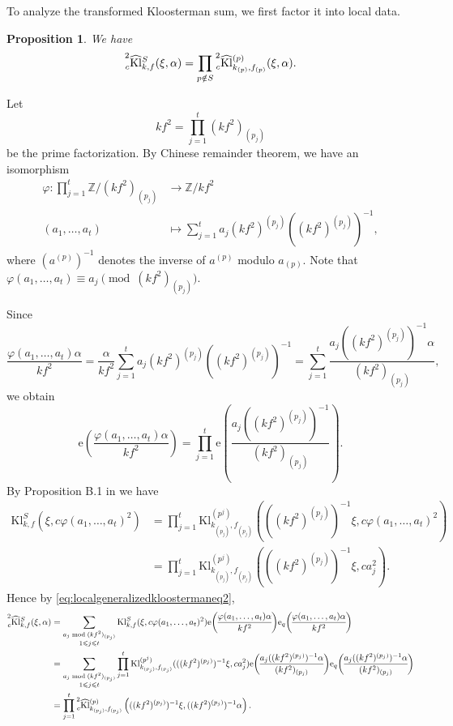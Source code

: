 \documentclass[10pt,oneside,reqno]{amsart}
\makeatletter
\newcommand\rme{\mathrm{e}}
\newcommand\ZZ{\mathbb{Z}}
\newcommand\Kl{\mathrm{Kl}}
\renewcommand\leq{\leqslant}
\newcommand\legendresymbol[2]{\genfrac{(}{)}{}{}{#1}{#2}}
\theoremstyle{THEOREM}
\newtheorem{proposition}[theorem]{Proposition}
\theoremstyle{DEFINITION}
\theoremstyle{EXERCISE}
\numberwithin{equation}{section}
\renewenvironment{proof}[1][\proofname]{\par
  \vspace{-6pt}
  \pushQED{\qed}
  \normalfont \topsep6\p@\@plus6\p@\relax
  \trivlist
  \item[\hskip\labelsep\rmfamily\bfseries
    #1\@addpunct{:}]\ignorespaces
}{
  \popQED\endtrivlist\@endpefalse
  \vspace{-6pt}
}
\makeatother
\begin{document}
To analyze the transformed Kloosterman sum, we first factor it into local data.
\begin{proposition}\label{prop:prodkloostermanlocal}
We have
\[
\prescript{2}{c}{\widehat{\Kl}}_{k,f}^S(\xi,\alpha)=\prod_{p\notin S}\prescript{2}{c}{\widehat{\Kl}}_{k_{(p)},f_{(p)}}^{(p)}(\xi,\alpha).
\]
\end{proposition}
\begin{proof}
Let
\[
kf^2=\prod_{j=1}^{t}(kf^2)_{(p_j)}
\]
be the prime factorization. By Chinese remainder theorem, we have an isomorphism
\[
\begin{split}
   \varphi: \prod_{j=1}^{t}\ZZ/(kf^2)_{(p_j)}&\to \ZZ/kf^2 \\
     (a_1,\dots,a_t) &\mapsto \sum_{j=1}^{t} a_j(kf^2)^{(p_j)}((kf^2)^{(p_j)})^{-1},
\end{split}
\]
where $(a^{(p)})^{-1}$ denotes the inverse of $a^{(p)}$ modulo $a_{(p)}$. Note that $\varphi(a_1,\dots,a_t)\equiv a_j\pmod{(kf^2)_{(p_j)}}$.

Since
\[
\frac{\varphi(a_1,\dots,a_t)\alpha}{kf^2}=\frac{\alpha}{kf^2}\sum_{j=1}^{t} a_j(kf^2)^{(p_j)}((kf^2)^{(p_j)})^{-1}=\sum_{j=1}^{t} \frac{a_j((kf^2)^{(p_j)})^{-1}\alpha}{(kf^2)_{(p_j)}},
\]
we obtain
\[
\rme\legendresymbol{\varphi(a_1,\dots,a_t)\alpha}{kf^2}=\prod_{j=1}^{t} \rme\legendresymbol{a_j((kf^2)^{(p_j)})^{-1}}{(kf^2)_{(p_j)}}.
\]
By Proposition B.1 in \cite{cheng2025b} we have
\begin{align*}
\Kl_{k,f}^S(\xi,c\varphi(a_1,\dots,a_t)^2 )&=\prod_{j=1}^{t}\Kl_{k_{(p_j)},f_{(p_j)}}^{(p^j)}(((kf^2)^{(p_j)})^{-1}\xi,c \varphi(a_1,\dots,a_t)^2)\\
&=\prod_{j=1}^{t}\Kl_{k_{(p_j)},f_{(p_j)}}^{(p^j)} (((kf^2)^{(p_j)})^{-1}\xi, ca_j^2).
\end{align*}
Hence by \eqref{eq:localgeneralizedkloostermaneq2},
\begin{align*}
  \prescript{2}{c}{\widehat{\Kl}}_{k,f}^S(\xi,\alpha)&=\sum_{\substack{a_j \bmod (kf^2)_{(p_j)}\\ 1\leq j\leq t}}\Kl_{k,f}^S(\xi,c\varphi(a_1,\dots,a_t)^2)\rme\legendresymbol{\varphi(a_1,\dots,a_t) \alpha}{kf^2} \rme_q\legendresymbol{\varphi(a_1,\dots,a_t) \alpha}{kf^2}\\
   & =\sum_{\substack{a_j \bmod (kf^2)_{(p_j)}\\ 1\leq j\leq t}} \prod_{j=1}^{t} \Kl_{k_{(p_j)},f_{(p_j)}}^{(p^j)}(((kf^2)^{(p_j)})^{-1}\xi, ca_j^2) \rme\legendresymbol{a_j((kf^2)^{(p_j)})^{-1}\alpha}{(kf^2)_{(p_j)}} \rme_q\legendresymbol{a_j((kf^2)^{(p_j)})^{-1}\alpha}{(kf^2)_{(p_j)}}\\
   & = \prod_{j=1}^{t}\prescript{2}{c}{\widehat{\Kl}}_{k_{(p_j)},f_{(p_j)}}^{(p)}\left(((kf^2)^{(p_j)})^{-1}\xi, ((kf^2)^{(p_j)})^{-1}\alpha\right).
\end{align*}


\end{proof}
\end{document}
